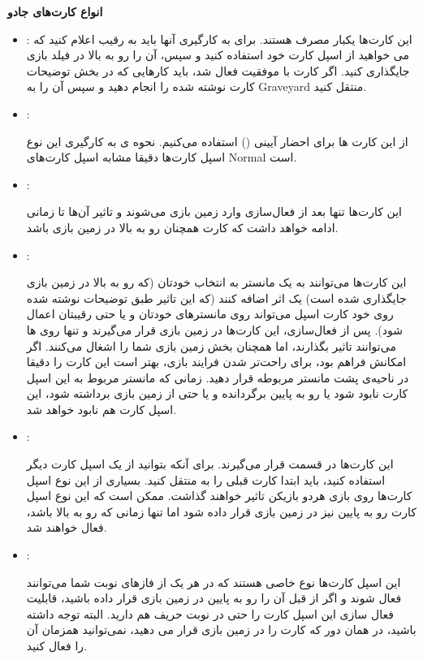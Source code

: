 \documentclass[]{article}
\begin{document}
\textbf{انواع کارت‌های جادو}

\begin{itemize}
	\item {}:
این کارت‌ها یکبار مصرف هستند. برای به کارگیری آنها باید به رقیب اعلام کنید که می خواهید از اسپل کارت خود استفاده کنید و سپس، آن را رو به بالا در فیلد بازی جایگذاری کنید. اگر کارت با موفقیت فعال شد، باید کارهایی که در بخش توضیحات کارت نوشته شده را انجام دهید و سپس آن را به Graveyard منتقل کنید.
	
	 \item {}:
	 
	 از این کارت ها برای احضار آیینی ()  استفاده می‌کنیم. نحوه ی به کارگیری این نوع اسپل کارت‌ها دقیقا مشابه اسپل کارت‌های Normal است.
	 
	 \item {}: 
	 
	 این کارت‌ها تنها بعد از فعال‌سازی وارد زمین بازی می‌شوند و تاثیر آن‌ها تا زمانی ادامه خواهد داشت که کارت همچنان رو به بالا در زمین بازی باشد.
	 
	 \item {}:
	 
	 این کارت‌ها می‌توانند به یک مانستر به انتخاب خودتان (که رو به بالا در زمین بازی جایگذاری شده است) یک اثر اضافه کنند (که این تاثیر طبق توضیحات نوشته شده روی خود کارت اسپل می‌تواند روی مانستر‌های خودتان و یا حتی رقیبتان اعمال شود).
	 پس از فعال‌سازی، این کارت‌ها در زمین بازی قرار می‌گیرند و تنها روی  ها می‌توانند تاثیر بگذارند، اما همچنان بخش   زمین بازی شما را اشغال می‌کنند.
	 اگر امکانش فراهم بود، برای راحت‌تر شدن فرایند بازی، بهتر است این کارت را دقیقا در ناحیه‌ی پشت مانستر مربوطه قرار دهید. زمانی که مانستر مربوط به این اسپل کارت نابود شود یا رو به پایین برگردانده و یا حتی از زمین بازی برداشته شود، این اسپل کارت هم نابود خواهد شد.
	 
	 
	 \item {}:
	 
	 این کارت‌ها در قسمت  قرار می‌گیرند. برای آنکه بتوانید از یک اسپل کارت  دیگر استفاده کنید، باید ابتدا کارت قبلی را به  منتقل کنید.
	 بسیاری از این نوع اسپل کارت‌ها روی بازی هردو بازیکن تاثیر خواهند گذاشت. ممکن است که این نوع اسپل کارت رو به پایین نیز در زمین بازی قرار داده شود اما تنها زمانی که رو به بالا باشد، فعال خواهند شد.
	 
	
	\item {}:
	
	این اسپل کارت‌ها نوع خاصی هستند که در هر یک از فازهای نوبت شما می‌توانند فعال شوند و  اگر از قبل آن را رو به پایین در زمین بازی قرار داده باشید، قابلیت فعال سازی این اسپل کارت را حتی در نوبت حریف هم دارید. البته توجه داشته باشید، در همان دور که کارت را در زمین بازی قرار می دهید، نمی‌توانید همزمان آن را فعال کنید.
	
	
\end{itemize}
\end{document}
